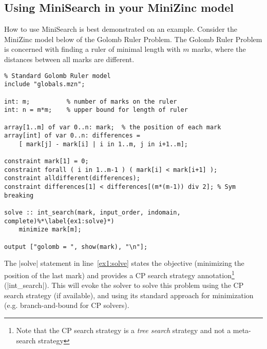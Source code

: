 \documentclass[a4paper,13pt,onecolumn]{article}%
\begin{document}
\subsection{Using MiniSearch in your MiniZinc model}
How to use MiniSearch is best demonstrated on an example. Consider the MiniZinc model below of the Golomb Ruler Problem.
The Golomb Ruler Problem is concerned with finding a ruler of minimal length with $m$ marks,
where the distances between all marks are different. 
\begin{lstlisting}
% Standard Golomb Ruler model
include "globals.mzn";

int: m;          % number of marks on the ruler
int: n = m*m;    % upper bound for length of ruler

array[1..m] of var 0..n: mark;  % the position of each mark
array[int] of var 0..n: differences =
    [ mark[j] - mark[i] | i in 1..m, j in i+1..m];

constraint mark[1] = 0;
constraint forall ( i in 1..m-1 ) ( mark[i] < mark[i+1] );
constraint alldifferent(differences);
constraint differences[1] < differences[(m*(m-1)) div 2]; % Sym breaking

solve :: int_search(mark, input_order, indomain, complete)%*\label{ex1:solve}*)
    minimize mark[m];

output ["golomb = ", show(mark), "\n"];
\end{lstlisting}
The \mzninline|solve| statement in line~\ref{ex1:solve} states the
objective (minimizing the position of the last mark) and provides 
a CP search strategy annotation\footnote{Note that the CP search strategy is a {\em tree search} strategy and not a meta-search strategy} (\mzninline|int_search|).
This will evoke the solver to solve this problem using the CP search strategy 
(if available), and using its standard approach for minimization (e.g. branch-and-bound for CP solvers).
\end{document}
